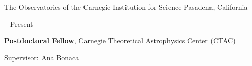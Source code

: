 \documentclass[cv.tex]{subfiles}
\begin{document}
{\color{themecolor} \large
The Observatories of the Carnegie Institution for Science
}
\hfill
Pasadena, California
\par\noindent
\parbox{0.18\textwidth}{%
	 -- Present \par
	\null
}
\hspace{1mm}
\parbox{0.8\textwidth}{%
	\vspace{1mm}
	\textbf{Postdoctoral Fellow}, Carnegie Theoretical Astrophysics Center 
	(CTAC) \par
	Supervisor: Ana Bonaca
}
\end{document}
